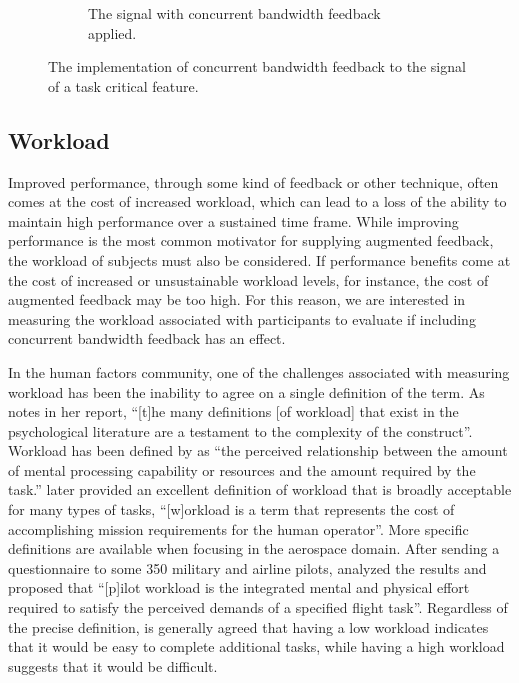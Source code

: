 \begin{figure}[p]
\begin{center}
\begin{subfigure}{0.7\linewidth}
            \caption[The signal with concurrent bandwidth feedback applied]{The signal with concurrent bandwidth feedback applied.}
            \label{fig:signal_w_feedback}
        \end{subfigure}
        \caption[The implementation of concurrent bandwidth feedback to the signal of a task critical feature]{The implementation of concurrent bandwidth feedback to the signal of a task critical feature.}
        \label{fig:cbf}%
    \end{center}
\end{figure}

\subsection{Workload}
Improved performance, through some kind of feedback or other technique, often comes at the cost of increased workload, which can lead to a loss of the ability to maintain high performance over a sustained time frame.
While improving performance is the most common motivator for supplying augmented feedback, the workload of subjects must also be considered.
If performance benefits come at the cost of increased or unsustainable workload levels, for instance, the cost of augmented feedback may be too high.
For this reason, we are interested in measuring the workload associated with participants to evaluate if including concurrent bandwidth feedback has an effect.

In the human factors community, one of the challenges associated with measuring workload has been the inability to agree on a single definition of the term.
As \citeauthor{hart_nasa-task_2006} notes in her \citeyear{hart_nasa-task_2006} report, ``[t]he many definitions [of workload] that exist in the psychological literature are a testament to the complexity of the construct''.
Workload has been defined by \citeauthor{hart_development_1988} as ``the perceived relationship between the amount of mental processing capability or resources and the amount required by the task.''
\citeauthor{hart_nasa-task_2006} later provided an excellent definition of workload that is broadly acceptable for many types of tasks, ``[w]orkload is a term that represents the cost of accomplishing mission requirements for the human operator''.
More specific definitions are available when focusing in the aerospace domain.
After sending a questionnaire to some 350 military and airline pilots, \citeauthor{ellis1982airline} analyzed the results and proposed that ``[p]ilot workload is the integrated mental and physical effort required to satisfy the perceived demands of a specified flight task''.
Regardless of the precise definition, is generally agreed that having a low workload indicates that it would be easy to complete additional tasks, while having a high workload suggests that it would be difficult.

